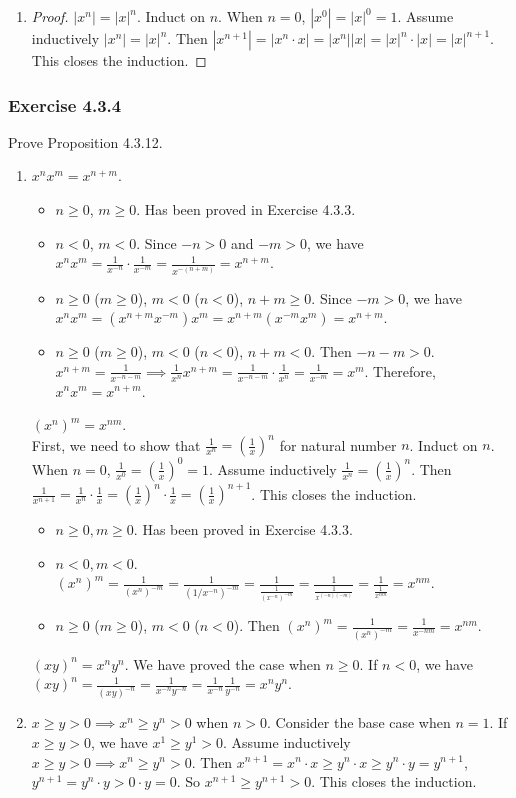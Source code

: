\documentclass[12pt, letter]{article}
\newcommand{\ssc}{\subsubsection* }
\newcommand{\E}{Exercise }
\begin{document}
\begin{enumerate}[label=(\alph*)]
\begin{proof}
        The latter part can be shown in a similar way.
    \end{proof}
    \item \begin{proof}
        $|x^n|=|x|^n$. Induct on $n$. When $n=0$, $|x^0|=|x|^0=1$. Assume inductively $|x^n|=|x|^n$. Then $|x^{n+1}|=|x^n\cdot x|=|x^n||x|=|x|^n\cdot |x|=|x|^{n+1}$.
        This closes the induction.
    \end{proof}
\end{enumerate}
\ssc{\E 4.3.4}
Prove Proposition 4.3.12.
\begin{enumerate}[label=(\alph*)]
    \item $x^n x^m=x^{n+m}$. 
    \begin{itemize}
        \item $n\geq 0$, $m\geq 0$. Has been proved in Exercise 4.3.3.
        \item $n<0$, $m<0$. Since $-n>0$ and $-m>0$, we have $x^n x^m=\frac{1}{x^{-n}}\cdot \frac{1}{x^{-m}}=\frac{1}{x^{-(n+m)}}=x^{n+m}$.
        \item $n\geq 0$ ($m\geq 0$), $m<0$ ($n<0$), $n+m\geq 0$. Since $-m>0$, we have $x^n x^m=(x^{n+m}x^{-m})x^m=x^{n+m}(x^{-m}x^m)=x^{n+m}$.
        \item $n\geq 0$ ($m\geq 0$), $m<0$ ($n<0$), $n+m<0$. Then $-n-m>0$. $x^{n+m}=\frac{1}{x^{-n-m}}\implies \frac{1}{x^n}x^{n+m}=\frac{1}{x^{-n-m}}\cdot\frac{1}{x^n}
        =\frac{1}{x^{-m}}=x^m$. Therefore, $x^n x^m=x^{n+m}$.
    \end{itemize}
    $(x^n)^m=x^{nm}$. \\
    First, we need to show that $\frac{1}{x^n}=(\frac{1}{x})^n$ for natural number $n$. Induct on $n$. When $n=0$, $\frac{1}{x^0}=(\frac{1}{x})^0=1$. 
    Assume inductively $\frac{1}{x^n}=(\frac{1}{x})^n$. Then $\frac{1}{x^{n+1}}=\frac{1}{x^n}\cdot \frac{1}{x}=(\frac{1}{x})^n\cdot\frac{1}{x}=(\frac{1}{x})^{n+1}$. 
    This closes the induction.
    \begin{itemize}
        \item $n\geq 0, m\geq 0$. Has been proved in Exercise 4.3.3.
        \item $n<0, m<0$. $(x^n)^m=\frac{1}{(x^n)^{-m}}=\frac{1}{(1/x^{-n})^{-m}}=\frac{1}{\frac{1}{(x^{-n})^{-m}}}=\frac{1}{\frac{1}{x^{(-n)(-m)}}}=\frac{1}{\frac{1}{x^{nm}}}=x^{nm}$.
        \item $n\geq 0$ ($m\geq 0$), $m<0$ ($n<0$). Then $(x^n)^m=\frac{1}{(x^n)^{-m}}=\frac{1}{x^{-nm}}=x^{nm}$.
    \end{itemize}
    $(xy)^n=x^n y^n$. We have proved the case when $n\geq 0$. If $n<0$, we have $(xy)^n=\frac{1}{(xy)^{-n}}=\frac{1}{x^{-n}y^{-n}}=\frac{1}{x^{-n}}\frac{1}{y^{-n}}=x^n y^n$.
    \item $x\geq y>0\implies x^n\geq y^n>0$ when $n>0$. Consider the base case when $n=1$. If $x\geq y>0$, we have $x^1\geq y^1>0$. Assume inductively $x\geq y>0\implies x^n\geq y^n>0$.
    Then $x^{n+1}=x^n\cdot x\geq y^n\cdot x\geq y^n\cdot y=y^{n+1}$, $y^{n+1}=y^n\cdot y>0\cdot y=0$. So $x^{n+1}\geq y^{n+1}>0$. This closes the induction.


\end{enumerate}
\end{document}
